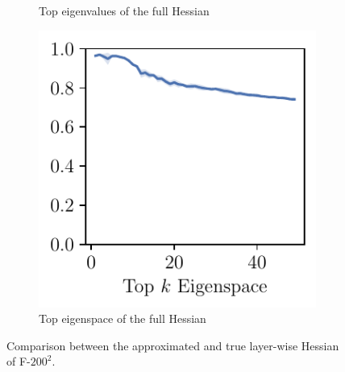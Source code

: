 \begin{figure}[ht]
\begin{subfigure}[b]{0.24\columnwidth}
    \vspace{-0.2in}
    \caption{Top eigenvalues of the full Hessian}
    \label{fig:eigenval_approx_full}
\end{subfigure}
\begin{subfigure}[b]{0.24\columnwidth}
    \captionsetup{justification=centering}
    \includegraphics[width=\columnwidth]{Figures/ApproxQuality/FC2_fixlr/MNIST_Exp1_FC2_fixlr0.01_Average_fulleigenvec_overlap.pdf}
    \vspace{-0.2in}
    \caption{Top eigenspace of the full Hessian}
    \label{fig:overlap_approx_full}
\end{subfigure}
\caption{Comparison between the approximated and true layer-wise Hessian of F-$200^2$.}
\vspace{-4pt}
\label{fig:eigeninfo_approx}
\end{figure}
